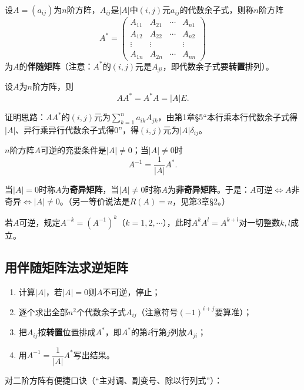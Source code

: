 \begin{definition}
设$A=(a_{ij})$为$n$阶方阵，$A_{ij}$是$|A|$中$(i,j)$元$a_{ij}$的代数余子式，则称$n$阶方阵
\[
A^{*}=\begin{pmatrix}
A_{11}&A_{21}&\cdots&A_{n1}\\
A_{12}&A_{22}&\cdots&A_{n2}\\
\vdots&\vdots&&\vdots\\
A_{1n}&A_{2n}&\cdots&A_{nn}
\end{pmatrix}
\]
为$A$的\textbf{伴随矩阵}（注意：$A^*$的$(i,j)$元是$A_{ji}$，即代数余子式要\textbf{转置}排列）。
\end{definition}

\begin{lemma}
设$A$为$n$阶方阵，则
\[
AA^{*}=A^{*}A=|A|E.
\]
\end{lemma}

证明思路：$AA^*$的$(i,j)$元为$\sum_{k=1}^{n}a_{ik}A_{jk}$，由第1章§5“本行乘本行代数余子式得$|A|$、异行乘异行代数余子式得$0$”，得$(i,j)$元为$|A|\delta_{ij}$。

\begin{theorem}
$n$阶方阵$A$可逆的充要条件是$|A|\neq0$；当$|A|\neq0$时
\[
A^{-1}=\frac{1}{|A|}A^{*}.
\]
\end{theorem}

当$|A|=0$时称$A$为\textbf{奇异矩阵}，当$|A|\neq0$时称$A$为\textbf{非奇异矩阵}。于是：$A$可逆$\iff A$非奇异$\iff|A|\neq0$。（另一等价说法是$R(A)=n$，见第3章§2。）


若$A$可逆，规定$A^{-k}=(A^{-1})^{k}$（$k=1,2,\cdots$），此时$A^{k}A^{l}=A^{k+l}$对一切整数$k,l$成立。

\subsection{用伴随矩阵法求逆矩阵}

\begin{enumerate}
\item 计算$|A|$，若$|A|=0$则$A$不可逆，停止；
\item 逐个求出全部$n^2$个代数余子式$A_{ij}$（注意符号$(-1)^{i+j}$要算准）；
\item 把$A_{ij}$按\textbf{转置}位置排成$A^{*}$，即$A^*$的第$i$行第$j$列放$A_{ji}$；
\item 用$A^{-1}=\dfrac{1}{|A|}A^{*}$写出结果。
\end{enumerate}

对二阶方阵有便捷口诀（“主对调、副变号、除以行列式”）：

